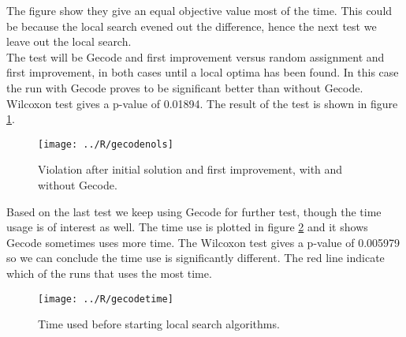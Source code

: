 The figure show they give an equal objective value most of the time. This could be because the local search 
evened out the difference, hence the next test we leave out the local search. \medskip \\
The test will be Gecode and first improvement versus random assignment and first improvement, in both cases until a 
local optima has been found. In this case the run with Gecode proves to be significant better than without Gecode. 
Wilcoxon test gives a p-value of 0.01894. The result of the test is shown in figure \ref{fig_gecodenols}. \\ 
\begin{figure}[!h]
\centering
\texttt{[image: ../R/gecodenols]} \caption{Violation after initial solution and first improvement, 
with and without Gecode.}\label{fig_gecodenols}
\end{figure}\noindent
Based on the last test we keep using Gecode for further test, though the time usage is of interest as well. The time 
use is plotted in figure \ref{fig_gecodetime2} and it shows Gecode sometimes uses more time. The Wilcoxon test gives a 
p-value of 0.005979 so we can conclude the time use is significantly different. The red line indicate which of the runs 
that uses the most time. 
\begin{figure}[!h]
\centering
\texttt{[image: ../R/gecodetime]} \caption{Time used before starting local 
search algorithms.}\label{fig_gecodetime2}
\end{figure}\noindent
\newpage
\phantom{p. 2}
\clearpage
